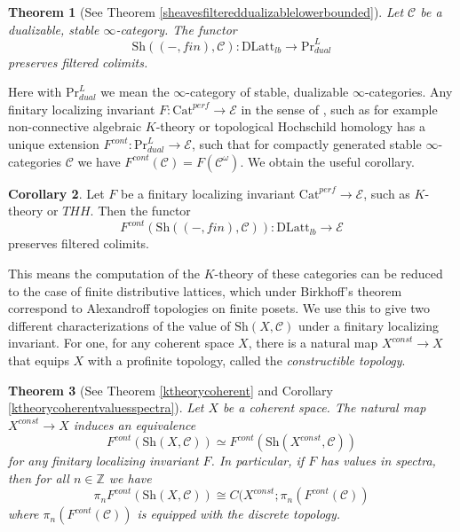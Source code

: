 \documentclass[10pt]{amsart}
\newtheorem{theorem}{Theorem}[section]
\theoremstyle{definition}
\newtheorem{corollary}[theorem]{Corollary}
\begin{document}
\begin{theorem}[See Theorem \ref{sheavesfiltereddualizablelowerbounded}]
Let $\mathcal{C}$ be a dualizable, stable $\infty$-category. The functor
$$ \mathrm{Sh}((-,fin),\mathcal{C}) : \mathrm{DLatt}_{lb} \rightarrow \mathrm{Pr}^L_{dual} $$
preserves filtered colimits.
\end{theorem}

Here with $\mathrm{Pr}^L_{dual}$ we mean the $\infty$-category of stable, dualizable $\infty$-categories. Any finitary localizing invariant $F : \mathrm{Cat}^{perf} \rightarrow \mathcal{E}$ in the sense of \cite{blumberg_gepner_tabuada}, such as for example non-connective algebraic $K$-theory or topological Hochschild homology has a unique extension $F^{cont} : \mathrm{Pr}^L_{dual} \rightarrow \mathcal{E}$, such that for compactly generated stable $\infty$-categories $\mathcal{C}$ we have $F^{cont}( \mathcal{C} ) = F( \mathcal{C}^\omega )$. \cite{efimov2025ktheorylocalizinginvariantslarge} We obtain the useful corollary.

\begin{corollary}
Let $F$ be a finitary localizing invariant $ \mathrm{Cat}^{perf} \rightarrow  \mathcal{E}$, such as $K$-theory or $THH$. Then the functor
$$ F^{cont}( \mathrm{Sh}((-,fin),\mathcal{C})) : \mathrm{DLatt}_{lb} \rightarrow \mathcal{E}$$
preserves filtered colimits.
\end{corollary}

This means the computation of the $K$-theory of these categories can be reduced to the case of finite distributive lattices, which under Birkhoff's theorem correspond to Alexandroff topologies on finite posets. We use this to give two different characterizations of the value of $\mathrm{Sh}(X,\mathcal{C})$ under a finitary localizing invariant. For one, for any coherent space $X$, there is a natural map $X^{const} \rightarrow X$ that equips $X$ with a profinite topology, called the \emph{constructible topology}.

\begin{theorem}[See Theorem \ref{ktheorycoherent} and Corollary \ref{ktheorycoherentvaluesspectra}]
Let $X$ be a coherent space. The natural map $X^{const} \rightarrow X$ induces an equivalence
$$F^{cont}( \mathrm{Sh}(X,\mathcal{C})) \simeq F^{cont}( \mathrm{Sh}(X^{const},\mathcal{C})) $$
for any finitary localizing invariant $F$. In particular, if $F$ has values in spectra, then for all $n \in \mathbb{Z}$ we have
$$ \pi_n F^{cont}( \mathrm{Sh}(X,\mathcal{C})) \cong C(X^{const}; \pi_n(F^{cont}(\mathcal{C}) )$$
where $\pi_n(F^{cont}(\mathcal{C}))$ is equipped with the discrete topology.
\end{theorem}
\end{document}

